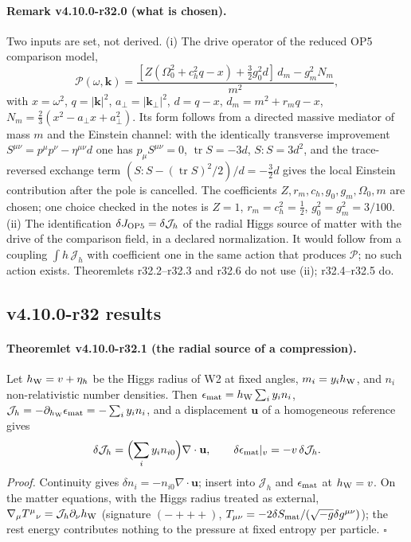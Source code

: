 \paragraph{Remark v4.10.0-r32.0 (what is chosen).}
Two inputs are set, not derived.
(i) The drive operator of the reduced OP5 comparison model,
\[
 \mathcal P(\omega,\mathbf k)=\frac{[Z(\Omega_0^2+c_h^2q-x)+\tfrac32g_0^2d]\,d_m-g_m^2N_m}{m^2},
\]
with \(x=\omega^2\), \(q=|\mathbf k|^2\), \(a_\perp=|\mathbf k_\perp|^2\), \(d=q-x\), \(d_m=m^2+r_mq-x\), \(N_m=\tfrac23(x^2-a_\perp x+a_\perp^2)\).  Its form follows from
a directed massive mediator of mass \(m\) and the Einstein channel: with the identically transverse improvement
\(S^{\mu\nu}=p^\mu p^\nu-\eta^{\mu\nu}d\) one has \(p_\mu S^{\mu\nu}=0\), \(\operatorname{tr}S=-3d\), \(S\!:\!S=3d^2\), and the trace-reversed exchange term
\((S\!:\!S-(\operatorname{tr}S)^2/2)/d=-\tfrac32d\) gives the local Einstein contribution after the pole is cancelled.  The coefficients
\(Z,r_m,c_h,g_0,g_m,\Omega_0,m\) are chosen; one choice checked in the notes is \(Z=1\), \(r_m=c_h^2=\tfrac12\), \(g_0^2=g_m^2=3/100\).
(ii) The identification \(\delta J_{\rm OP5}=\delta\mathcal J_h\) of the radial Higgs source of matter with the drive of the comparison field, in a
declared normalization.  It would follow from a coupling \(\int h\,\mathcal J_h\) with coefficient one in the same action that produces
\(\mathcal P\); no such action exists.  Theoremlets r32.2--r32.3 and r32.6 do not use (ii); r32.4--r32.5 do.

\subsection*{v4.10.0-r32 results}
\label{subsec:v4100-r32-results}

\paragraph{Theoremlet v4.10.0-r32.1 (the radial source of a compression).}
Let \(h_{\rm W}=v+\eta_h\) be the Higgs radius of W2 at fixed angles, \(m_i=y_ih_{\rm W}\), and \(n_i\) non-relativistic number densities.  Then
\(\epsilon_{\rm mat}=h_{\rm W}\sum_iy_in_i\), \(\mathcal J_h=-\partial_{h_{\rm W}}\epsilon_{\rm mat}=-\sum_iy_in_i\), and a displacement \(\mathbf u\) of a homogeneous
reference gives
\[
 \delta\mathcal J_h=\Bigl(\sum_iy_in_{i0}\Bigr)\nabla\cdot\mathbf u,\qquad \delta\epsilon_{\rm mat}|_v=-v\,\delta\mathcal J_h .
\]
\emph{Proof.} Continuity gives \(\delta n_i=-n_{i0}\nabla\cdot\mathbf u\); insert into \(\mathcal J_h\) and \(\epsilon_{\rm mat}\) at \(h_{\rm W}=v\).  On the matter equations,
with the Higgs radius treated as external, \(\nabla_\mu T^\mu{}_\nu=\mathcal J_h\partial_\nu h_{\rm W}\) (signature \((-+++)\),
\(T_{\mu\nu}=-2\delta S_{\rm mat}/(\sqrt{-g}\delta g^{\mu\nu})\)); the rest energy contributes nothing to the pressure at fixed entropy per particle.
\(\square\)


